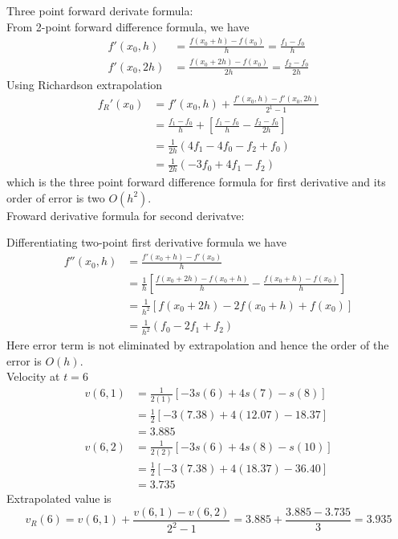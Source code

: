 \documentclass[12pt,class=book,crop=false]{standalone}
\begin{document}
\begin{soln}
    Three point forward derivate formula:\\
    From 2-point forward difference formula, we have
    \begin{align*}
        f'(x_0,h)   & =\frac{f(x_0+h)-f(x_0)}{h}=\frac{f_1-f_0}{h}    \\
        f' (x_0,2h) & =\frac{f(x_0+2h)-f(x_0)}{2h}=\frac{f_2-f_0}{2h}
    \end{align*}
    Using Richardson extrapolation
    \begin{align*}
        f_R' (x_0) & =f' (x_0,h)+\frac{f' (x_0,h)-f' (x_0,2h)}{2^1-1}                       \\
                   & =\frac{f_1-f_0}{h}+\left[ \frac{f_1-f_0}{h}-\frac{f_2-f_0}{2h} \right] \\
                   & =\frac{1}{2h} (4f_1-4f_0-f_2+f_0 )                                     \\
                   & =\frac{1}{2h} (-3f_0+4f_1-f_2 )
    \end{align*}
    which is the three point forward difference formula for first derivative and its order of error is two $ O(h^2) $.\\


    Froward derivative formula for second derivatve:


    Differentiating two-point first derivative formula we have
    \begin{align*}
        f''(x_0,h) & =\frac{f'(x_0+h)-f' (x_0)}{h}                                                      \\
                   & =\frac{1}{h} \left[ \frac{f(x_0+2h)-f(x_0+h)}{h}-\frac{f(x_0+h)-f(x_0)}{h} \right] \\
                   & =\frac{1}{h^2} [f(x_0+2h)-2f(x_0+h)+f(x_0)]                                        \\
                   & =\frac{1}{h^2} (f_0-2f_1+f_2)
    \end{align*}
    Here error term is not eliminated by extrapolation and hence the order of the error is $ O(h) $.\\


    Velocity at $ t=6 $
    \begin{align*}
        v(6,1) & =\frac{1}{2(1)}[-3s(6)+4s(7)-s(8)]    \\
               & =\frac{1}{2}[-3(7.38)+4(12.07)-18.37] \\
               & =3.885                                \\
        v(6,2) & =\frac{1}{2(2)}[-3s(6)+4s(8)-s(10)]   \\
               & =\frac{1}{2}[-3(7.38)+4(18.37)-36.40] \\
               & =3.735
    \end{align*}
    Extrapolated value is
    \[
        v_R (6)=v(6,1)+\frac{v(6,1)-v(6,2)}{2^2-1}=3.885+\frac{3.885-3.735}{3}=3.935
    \]


\end{soln}
\end{document}
